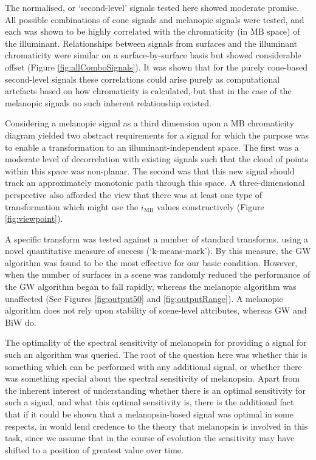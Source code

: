 The normalised, or `second-level' signals tested here showed moderate promise. All possible combinations of cone signals and melanopic signals were tested, and each was shown to be highly correlated with the chromaticity (in \gls{MB} space) of the illuminant. Relationships between signals from surfaces and the illuminant chromaticity were similar on a surface-by-surface basis but showed considerable offset (Figure \ref{fig:allComboSignals}). It was shown that for the purely cone-based second-level signals these correlations could arise purely as computational artefacts based on how chromaticity is calculated, but that in the case of the melanopic signals no such inherent relationship existed.

Considering a melanopic signal as a third dimension upon a \gls{MB} chromaticity diagram yielded two abstract requirements for a signal for which the purpose was to enable a transformation to an illuminant-independent space. The first was a moderate level of decorrelation with existing signals such that the cloud of points within this space was non-planar. The second was that this new signal should track an approximately monotonic path through this space. A three-dimensional perspective also afforded the view that there was at least one type of transformation which might use the $i_{\text{MB}}$ values constructively (Figure \ref{fig:viewpoint}).

A specific transform was tested against a number of standard transforms, using a novel quantitative measure of success (`k-means-mark'). By this measure, the \gls{GW} algorithm was found to be the most effective for our basic condition. However, when the number of surfaces in a scene was randomly reduced the performance of the \gls{GW} algorithm began to fall rapidly, whereas the melanopic algorithm was unaffected (See Figures \ref{fig:output50} and \ref{fig:outputRange}). A melanopic algorithm does not rely upon stability of scene-level attributes, whereas \gls{GW} and \gls{BiW} do.

The optimality of the spectral sensitivity of melanopsin for providing a signal for such an algorithm was queried. The root of the question here was whether this is something which can be performed with any additional signal, or whether there was something special about the spectral sensitivity of melanopsin. Apart from the inherent interest of understanding whether there is an optimal sensitivity for such a signal, and what this optimal sensitivity is, there is the additional fact that if it could be shown that a melanopsin-based signal was optimal in some respects, in would lend credence to the theory that melanopsin is involved in this task, since we assume that in the course of evolution the sensitivity may have shifted to a position of greatest value over time.

